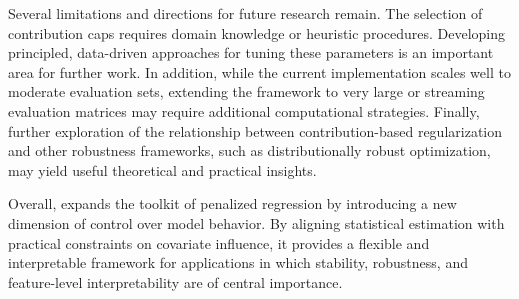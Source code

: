 \documentclass[article,shortnames,nofooter]{jss}
\begin{document}
Several limitations and directions for future research remain. The selection of contribution caps requires domain knowledge or heuristic procedures. Developing principled, data-driven approaches for tuning these parameters is an important area for further work. In addition, while the current implementation scales well to moderate evaluation sets, extending the framework to very large or streaming evaluation matrices may require additional computational strategies. Finally, further exploration of the relationship between contribution-based regularization and other robustness frameworks, such as distributionally robust optimization, may yield useful theoretical and practical insights.

Overall,  expands the toolkit of penalized regression by introducing a new dimension of control over model behavior. By aligning statistical estimation with practical constraints on covariate influence, it provides a flexible and interpretable framework for applications in which stability, robustness, and feature-level interpretability are of central importance.

\clearpage

\end{document}
